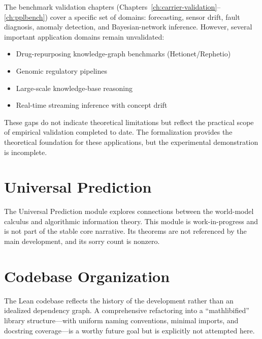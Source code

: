 The benchmark validation chapters
(Chapters~\ref{ch:carrier-validation}--\ref{ch:pplbench}) cover a
specific set of domains: forecasting, sensor drift, fault diagnosis,
anomaly detection, and Bayesian-network inference.  However, several
important application domains remain unvalidated:

\begin{itemize}
\item Drug-repurposing knowledge-graph benchmarks
  (Hetionet/Rephetio)
\item Genomic regulatory pipelines
\item Large-scale knowledge-base reasoning
\item Real-time streaming inference with concept drift
\end{itemize}

\noindent
These gaps do not indicate theoretical limitations but reflect the
practical scope of empirical validation completed to date.  The
formalization provides the theoretical foundation for these
applications, but the experimental demonstration is incomplete.

\section{Universal Prediction}

The Universal Prediction module explores connections between the
world-model calculus and algorithmic information theory.  This module
is work-in-progress and is not part of the stable core narrative.
Its theorems are not referenced by the main development, and its
sorry count is nonzero.

\section{Codebase Organization}

The Lean codebase reflects the history of the development rather than
an idealized dependency graph.  A comprehensive refactoring into a
``mathlibified'' library structure---with uniform naming conventions,
minimal imports, and docstring coverage---is a worthy future goal but
is explicitly not attempted here.
